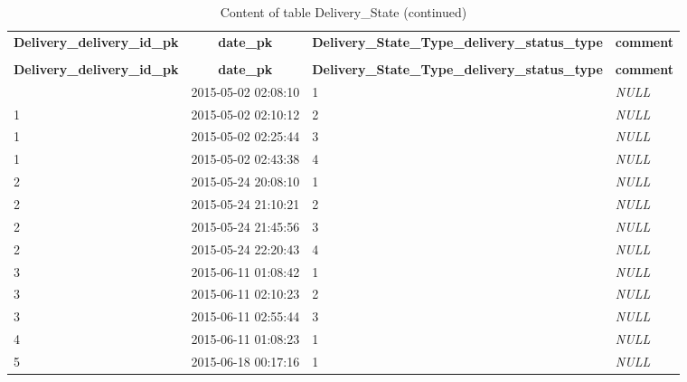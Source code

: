 \documentclass[parskip=half, a4paper, DIV=14]{scrartcl}
\begin{document}
%
%
 \begin{longtable}{|l|l|l|l|} 
 \hline \endhead \hline \endfoot \hline 
 \caption{Content of table Delivery\_State} \label{tab:Delivery_State-data} \\\hline \multicolumn{1}{|c|}{\textbf{Delivery\_delivery\_id\_pk}} & \multicolumn{1}{|c|}{\textbf{date\_pk}} & \multicolumn{1}{|c|}{\textbf{Delivery\_State\_Type\_delivery\_status\_type}} & \multicolumn{1}{|c|}{\textbf{comment}} \\ \hline \hline  \endfirsthead 
\caption{Content of table Delivery\_State (continued)} \\ \hline \multicolumn{1}{|c|}{\textbf{Delivery\_delivery\_id\_pk}} & \multicolumn{1}{|c|}{\textbf{date\_pk}} & \multicolumn{1}{|c|}{\textbf{Delivery\_State\_Type\_delivery\_status\_type}} & \multicolumn{1}{|c|}{\textbf{comment}} \\ \hline \hline \endhead \endfoot
1 & 2015-05-02 02:08:10 & 1 & \textit{NULL} \\ \hline 
1 & 2015-05-02 02:10:12 & 2 & \textit{NULL} \\ \hline 
1 & 2015-05-02 02:25:44 & 3 & \textit{NULL} \\ \hline 
1 & 2015-05-02 02:43:38 & 4 & \textit{NULL} \\ \hline 
2 & 2015-05-24 20:08:10 & 1 & \textit{NULL} \\ \hline 
2 & 2015-05-24 21:10:21 & 2 & \textit{NULL} \\ \hline 
2 & 2015-05-24 21:45:56 & 3 & \textit{NULL} \\ \hline 
2 & 2015-05-24 22:20:43 & 4 & \textit{NULL} \\ \hline 
3 & 2015-06-11 01:08:42 & 1 & \textit{NULL} \\ \hline 
3 & 2015-06-11 02:10:23 & 2 & \textit{NULL} \\ \hline 
3 & 2015-06-11 02:55:44 & 3 & \textit{NULL} \\ \hline 
4 & 2015-06-11 01:08:23 & 1 & \textit{NULL} \\ \hline 
5 & 2015-06-18 00:17:16 & 1 & \textit{NULL} \\ \hline 
 \end{longtable}
\end{document}

